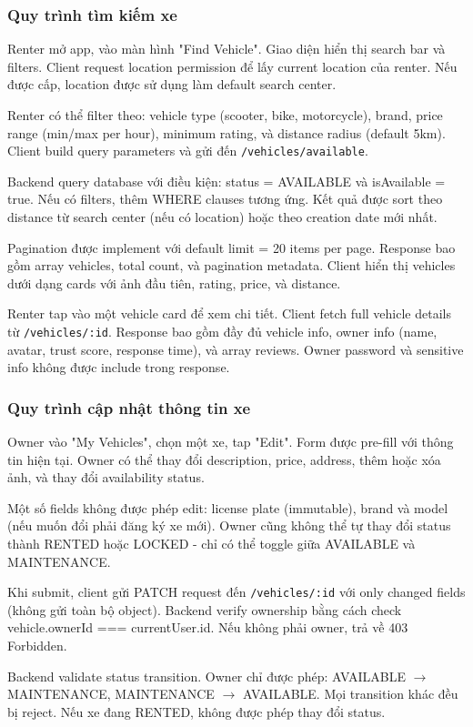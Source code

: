 \subsubsection{Quy trình tìm kiếm xe}
Renter mở app, vào màn hình "Find Vehicle". Giao diện hiển thị search bar và filters. Client request location permission để lấy current location của renter. Nếu được cấp, location được sử dụng làm default search center.

Renter có thể filter theo: vehicle type (scooter, bike, motorcycle), brand, price range (min/max per hour), minimum rating, và distance radius (default 5km). Client build query parameters và gửi đến \texttt{/vehicles/available}.

Backend query database với điều kiện: status = AVAILABLE và isAvailable = true. Nếu có filters, thêm WHERE clauses tương ứng. Kết quả được sort theo distance từ search center (nếu có location) hoặc theo creation date mới nhất.

Pagination được implement với default limit = 20 items per page. Response bao gồm array vehicles, total count, và pagination metadata. Client hiển thị vehicles dưới dạng cards với ảnh đầu tiên, rating, price, và distance.

Renter tap vào một vehicle card để xem chi tiết. Client fetch full vehicle details từ \texttt{/vehicles/:id}. Response bao gồm đầy đủ vehicle info, owner info (name, avatar, trust score, response time), và array reviews. Owner password và sensitive info không được include trong response.

\subsubsection{Quy trình cập nhật thông tin xe}
Owner vào "My Vehicles", chọn một xe, tap "Edit". Form được pre-fill với thông tin hiện tại. Owner có thể thay đổi description, price, address, thêm hoặc xóa ảnh, và thay đổi availability status.

Một số fields không được phép edit: license plate (immutable), brand và model (nếu muốn đổi phải đăng ký xe mới). Owner cũng không thể tự thay đổi status thành RENTED hoặc LOCKED - chỉ có thể toggle giữa AVAILABLE và MAINTENANCE.

Khi submit, client gửi PATCH request đến \texttt{/vehicles/:id} với only changed fields (không gửi toàn bộ object). Backend verify ownership bằng cách check vehicle.ownerId === currentUser.id. Nếu không phải owner, trả về 403 Forbidden.

Backend validate status transition. Owner chỉ được phép: AVAILABLE $\rightarrow$ MAINTENANCE, MAINTENANCE $\rightarrow$ AVAILABLE. Mọi transition khác đều bị reject. Nếu xe đang RENTED, không được phép thay đổi status.

